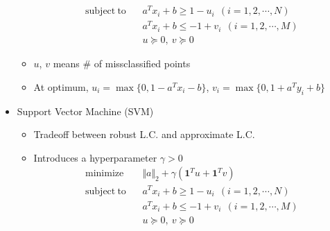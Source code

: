 \begin{itemize}
\begin{itemize}
$$\begin{aligned}
                \mathrm{subject~to}~~&~~a^Tx_i+b\geq1-u_i~~(i=1,2,\cdots,N) \\
                    &~~a^Tx_i+b\leq-1+v_i~~(i=1,2,\cdots,M) \\
                    &~~u\succeq0,~v\succeq0
            \end{aligned} $$
        \item $u$, $v$ means \# of missclassified points
        \item At optimum, $u_i=\max\{0,1-a^Tx_i-b\}$, $v_i=\max\{0,1+a^Ty_i+b\}$
    \end{itemize}
    \item Support Vector Machine (SVM)
    \begin{itemize}
        \item Tradeoff between robust L.C. and approximate L.C.
        \item Introduces a hyperparameter $\gamma>0$
            $$ \begin{aligned}
                \mathrm{minimize}~~&~~\Vert a\Vert_2+\gamma(\mathbf{1}^Tu+\mathbf{1}^Tv) \\
                \mathrm{subject~to}~~&~~a^Tx_i+b\geq1-u_i~~(i=1,2,\cdots,N) \\
                    &~~a^Tx_i+b\leq-1+v_i~~(i=1,2,\cdots,M) \\
                    &~~u\succeq0,~v\succeq0
            \end{aligned} $$
    \end{itemize}
\end{itemize}
\begin{figures}
\end{figures}
